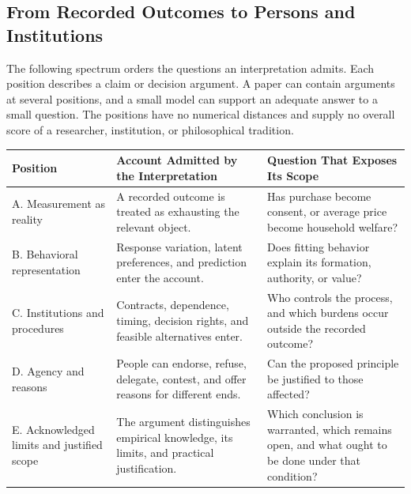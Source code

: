 \hypertarget{M09-from-recorded-outcomes-to-persons-and-institutions}{%
\subsection{From Recorded Outcomes to Persons and
Institutions}\label{M09-from-recorded-outcomes-to-persons-and-institutions}}

\noindent \noindent The following spectrum orders the questions an interpretation
admits. Each position describes a claim or decision argument. A paper
can contain arguments at several positions, and a small model can
support an adequate answer to a small question. The positions have no
numerical distances and supply no overall score of a researcher,
institution, or philosophical tradition.

\begin{table}[H]
\centering\small
\begin{tabular}{@{}
  >{\raggedright\arraybackslash}p{}
  >{\raggedright\arraybackslash}p{}
  >{\raggedright\arraybackslash}p{}@{}}
\toprule
Position & Account Admitted by the Interpretation & Question That
Exposes Its Scope \\
\midrule

A. Measurement as reality & A recorded outcome is treated as exhausting
the relevant object. & Has purchase become consent, or average price
become household welfare? \\
B. Behavioral representation & Response variation, latent preferences,
and prediction enter the account. & Does fitting behavior explain its
formation, authority, or value? \\
C. Institutions and procedures & Contracts, dependence, timing, decision
rights, and feasible alternatives enter. & Who controls the process, and
which burdens occur outside the recorded outcome? \\
D. Agency and reasons & People can endorse, refuse, delegate, contest,
and offer reasons for different ends. & Can the proposed principle be
justified to those affected? \\
E. Acknowledged limits and justified scope & The argument distinguishes
empirical knowledge, its limits, and practical justification. & Which
conclusion is warranted, which remains open, and what ought to be done
under that condition? \\
\bottomrule
\end{tabular}
\end{table}

